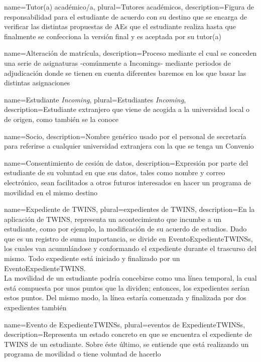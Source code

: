 {
	name=Tutor(a) académico/a,
	plural=Tutores académicos,
	description={Figura de responsabilidad para el estudiante de acuerdo con su destino que se encarga de verificar las distintas propuestas de \glspl{AE} que el estudiante realiza hasta que finalmente se confecciona la versión final y es aceptada por su tutor(a)}
}

{
	name=Alteración de matrícula,
	description={Proceso mediante el cual se conceden una serie de asignaturas -comúnmente a \glspl{Incoming}- mediante periodos de adjudicación donde se tienen en cuenta diferentes baremos en los que basar las distintas asignaciones}
}

{
	name=Estudiante \textit{Incoming},
	plural=Estudiantes \textit{Incoming},
	description={Estudiante extranjero que viene de acogida a la universidad local o de origen, como también se la conoce}
}

{
	name=Socio,
	description={Nombre genérico usado por el personal de secretaría para referirse a cualquier universidad extranjera con la que se tenga un \gls{Convenio}}
}

{
	name=Consentimiento de cesión de datos,
	description={Expresión por parte del estudiante de su voluntad en que sus datos, tales como nombre y correo electrónico, sean facilitados a otros futuros interesados en hacer un programa de movilidad en el mismo destino}
}

{
	name=Expediente de TWINS,
	plural=expedientes de TWINS,
	description={En la aplicación de TWINS, representa un acontecimiento que incumbe a un estudiante, como por ejemplo, la modificación de su acuerdo de estudios. Dado que es un registro de suma importancia, se divide en \glspl{EventoExpedienteTWINS}, los cuales van acumulándose y conformando el expediente durante el trascurso del mismo. Todo expediente está iniciado y finalizado por un \gls{EventoExpedienteTWINS}.\\La movilidad de un estudiante podría concebirse como una línea temporal, la cual está compuesta por unos puntos que la dividen; entonces, los expedientes serían estos puntos. Del mismo modo, la línea estaría comenzada y finalizada por dos expedientes también}
}

{
	name=Evento de \glspl{ExpedienteTWINS},
	plural=eventos de \glspl{ExpedienteTWINS},
	description={Representa un estado concreto en que se encuentra el expediente de TWINS de un estudiante. Sobre éste último, se entiende que está realizando un programa de movilidad o tiene voluntad de hacerlo}
}

\glsaddall